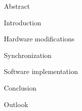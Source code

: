 




\usepackage{antropy_en}


  

  \begin{topchapter}{Abstract}
    
  \end{topchapter}

  \begin{topchapter}{Introduction}
    
  \end{topchapter}

  \begin{topchapter}{Hardware modifications}
    
  \end{topchapter}

  \begin{topchapter}{Synchronization}
    
  \end{topchapter}

  \begin{topchapter}{Software implementation}
    
  \end{topchapter}

  \begin{topchapter}{Conclusion}
    
  \end{topchapter}

  \begin{topchapter}{Outlook}
    
  \end{topchapter}

  \newpage
  \printglossaries

  \newpage
  \printbibliography

